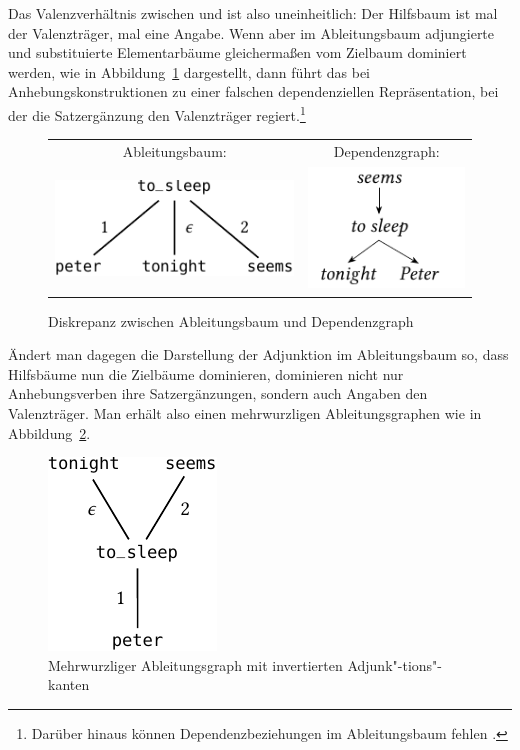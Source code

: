 Das Valenzverhältnis zwischen  und  ist also uneinheitlich: Der Hilfsbaum ist mal der Valenzträger, mal eine Angabe. Wenn aber im Ableitungsbaum adjungierte und substituierte Elementarbäume gleicherma\ss en vom Zielbaum dominiert werden, wie in Abbildung~\ref{fig-TAG-raising2} dargestellt, dann führt das bei Anhebungskonstruktionen zu einer falschen dependenziellen Repräsentation, bei der die Satzergänzung den Valenzträger regiert.\footnote{Darüber hinaus können Dependenzbeziehungen im Ableitungsbaum fehlen \citep{Rambow:etal:95}.}
\begin{figure}[t]
\centering
\begin{tabular}{cc}
Ableitungsbaum: & Dependenzgraph: \\[2ex]
\includegraphics{graphics/abb512a.pdf}
&
\includegraphics{graphics/abb512b.pdf}
\end{tabular}
\caption{\label{fig-TAG-raising2}Diskrepanz zwischen Ableitungsbaum und Dependenzgraph}
\end{figure} 
Ändert man dagegen die Darstellung der Adjunktion im Ableitungsbaum so, dass Hilfsbäume nun die Zielbäume dominieren, dominieren nicht nur Anhebungsverben ihre Satzergänzungen, sondern auch Angaben den Valenzträger. Man erhält also einen mehrwurzligen Ableitungsgraphen wie in Abbildung~\ref{fig-TAG-raising3}.
\begin{figure}[t]
\centering
\includegraphics{graphics/abb513.pdf}
\caption{\label{fig-TAG-raising3}Mehrwurzliger Ableitungsgraph mit invertierten Adjunk"-tions"-kanten}
\end{figure} 
